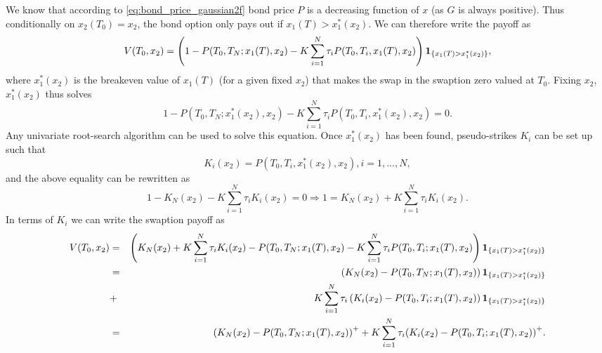 \documentclass[11pt,a4paper]{article}
\theoremstyle{break} %
\numberwithin{equation}{section}
\begin{document}
We know that according to \eqref{eq:bond_price_gaussian2f} bond price $P$ is a decreasing function of $x$ (as $G$ is always positive). Thus conditionally on $x_2(T_0)=x_2$, the bond option only pays out if ${{x_1}(T) > x_1^*({x_2})}$. We can therefore write the payoff as 
\begin{equation*}
  V({T_0},{x_2}) = \left( {1 - P({T_0},{T_N};{x_1}(T),{x_2}) - K\sum\limits_{i = 1}^N {{\tau _i}P({T_0},{T_i},{x_1}(T),{x_2})} } \right){{\bf{1}}_{\{ {x_1}(T) > x_1^*({x_2})\} }},
\end{equation*}
where $x_1^*({x_2})$ is the breakeven value of $x_1(T)$ (for a given fixed $x_2$) that makes the swap in the swaption zero valued at $T_0$. Fixing $x_2$, $x_1^*({x_2})$ thus solves
\begin{equation*}
  1 - P({T_0},{T_N};x_1^*({x_2}),{x_2}) - K\sum\limits_{i = 1}^N {{\tau _i}P({T_0},{T_i},x_1^*({x_2}),{x_2})}  = 0.
\end{equation*}
Any univariate root-search algorithm can be used to solve this equation. Once $x_1^*({x_2})$ has been found, pseudo-strikes $K_i$ can be set up such that 
\begin{equation*}
  {K_i}({x_2}) = P({T_0},{T_i},x_1^*({x_2}),{x_2}),i = 1,...,N, 
\end{equation*}
and the above equality can be rewritten as
\begin{equation*}
  1 - {K_N}({x_2}) - K\sum\limits_{i = 1}^N {{\tau _i}{K_i}({x_2})}  = 0 \Rightarrow 1 = {K_N}({x_2}) + K\sum\limits_{i = 1}^N {{\tau _i}{K_i}({x_2})}.
\end{equation*}
In terms of $K_i$ we can write the swaption payoff as
\small
\begin{eqnarray*}
V({T_0},{x_2}) &=& \left( {{K_N}({x_2}) + K\sum\limits_{i = 1}^N {{\tau _i}{K_i}({x_2})}  - P({T_0},{T_N};{x_1}(T),{x_2}) - K\sum\limits_{i = 1}^N {{\tau _i}P({T_0},{T_i};{x_1}(T),{x_2})} } \right){{\bf{1}}_{\{ {x_1}(T) > x_1^*({x_2})\} }}\\
 &=& \left( {{K_N}({x_2}) - P({T_0},{T_N};{x_1}(T),{x_2})} \right){{\bf{1}}_{\{ {x_1}(T) > x_1^*({x_2})\} }} \\
&+& K\sum\limits_{i = 1}^N {{\tau _i}\left( {{K_i}({x_2}) - P({T_0},{T_i};{x_1}(T),{x_2})} \right){{\bf{1}}_{\{ {x_1}(T) > x_1^*({x_2})\} }}} \\
 &=& {\left( {{K_N}({x_2}) - P({T_0},{T_N};{x_1}(T),{x_2})} \right)^ + } + K\sum\limits_{i = 1}^N {{\tau _i}{{\left( {{K_i}({x_2}) - P({T_0},{T_i};{x_1}(T),{x_2})} \right)}^ + }}.
\end{eqnarray*}
\normalsize
\end{document}
